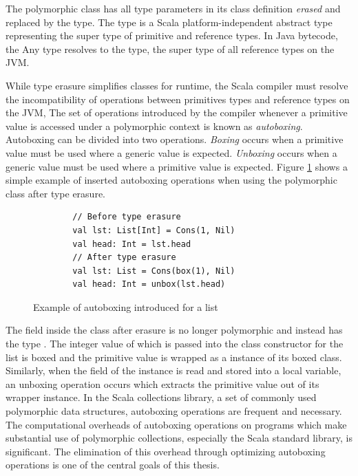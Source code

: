 The polymorphic  class has all type parameters in its class definition \textit{erased} and replaced by the  type.
The  type is a Scala platform-independent\cite{scala:overview} abstract type representing the super type of primitive and reference types.
In Java bytecode, the {Any} type resolves to the  type, the super type of all reference types on the JVM.

While type erasure simplifies classes for runtime, the Scala compiler must resolve the incompatibility of operations between primitives types and reference types on the JVM\cite{java:vm-spec},
The set of operations introduced by the compiler whenever a primitive value is accessed under a polymorphic context is known as \textit{autoboxing}\cite{java:autoboxing}. 
Autoboxing can be divided into two operations.
\textit{Boxing} occurs when a primitive value must be used where a generic value is expected.
\textit{Unboxing} occurs when a generic value must be used where a primitive value is expected.
Figure \ref{example:autoboxing} shows a simple example of inserted autoboxing operations when using the polymorphic  class after type erasure.

\begin{figure}[!htb]
	\begin{verbatim}
		// Before type erasure 	
		val lst: List[Int] = Cons(1, Nil)
		val head: Int = lst.head
		// After type erasure
		val lst: List = Cons(box(1), Nil)
		val head: Int = unbox(lst.head) 
	\end{verbatim}
	\caption{Example of autoboxing introduced for a list}
	\label{example:autoboxing}
\end{figure}

The  field inside the  class after erasure is no longer polymorphic and instead has the type . 
The integer value of  which is passed into the class constructor for the list is boxed and the primitive value is wrapped as a instance of its boxed class.
Similarly, when the  field of the instance is read and stored into a local variable, an unboxing operation occurs which extracts the primitive value out of its wrapper instance.
In the Scala collections library, a set of commonly used polymorphic data structures, autoboxing operations are frequent and necessary.
The computational overheads of autoboxing operations on programs which make substantial use of polymorphic collections, especially the Scala standard library, is significant\cite{scala:collections-optimization}.
The elimination of this overhead through optimizing autoboxing operations is one of the central goals of this thesis.

